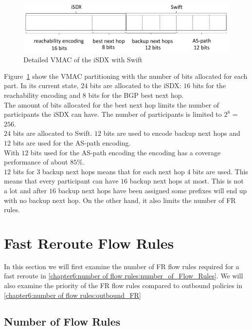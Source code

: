 \begin{figure}[h]
\center
\includegraphics[scale = 0.65]{Figures/eval_vmac2_cropped.pdf}
\caption{Detailed VMAC of the iSDX with Swift}
\label{fig:discussion_VMAC}
\end{figure}

Figure~\ref{fig:discussion_VMAC} show the VMAC partitioning with the number of bits allocated for each part. 
In its current state, $24$ bits are allocated to the iSDX: $16$ bits for the reachability encoding and $8$ bits for the BGP best next hop. \\
The amount of bits allocated for the best next hop limits the number of participants the iSDX can have. The number of participants is limited to $2^8$ = $256$. \\
$24$ bits are allocated to Swift. $12$ bits are used to encode backup next hops and $12$ bits are used for the AS-path encoding. \\
With $12$ bits used for the AS-path encoding the encoding has a coverage performance of about $85\%$. \cite{swift}\\
$12$ bits for $3$ backup next hops means that for each next hop $4$ bits are used. This means that every participant can have $16$ backup next hops at most. This is not a lot and after $16$ backup next hops have been assigned some prefixes will end up with no backup next hop. On the other hand, it also limits the number of FR rules. \\

\section{\label{chapter6:number of flow rules}Fast Reroute Flow Rules}

In this section we will first examine the number of FR flow rules required for a fast reroute in \ref{chapter6:number of flow rules:number_of_Flow_Rules}. We will also examine the priority of the FR flow rules compared to outbound policies in \ref{chapter6:number of flow rules:outbound_FR}

\subsection{\label{chapter6:number of flow rules:number_of_Flow_Rules}Number of Flow Rules}

